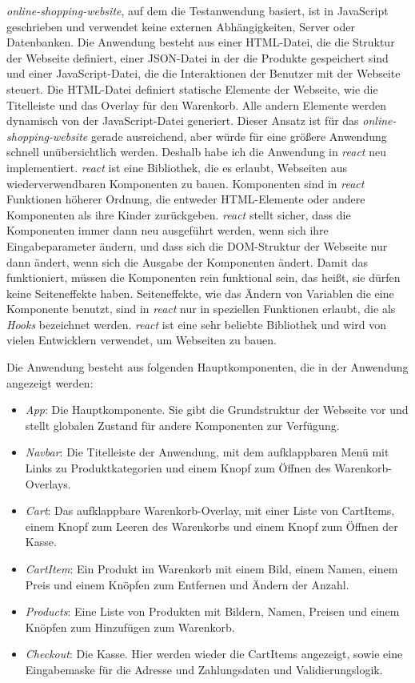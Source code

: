 \textit{online-shopping-website}, auf dem die Testanwendung basiert, ist in JavaScript geschrieben und verwendet keine externen Abhängigkeiten, Server oder Datenbanken.
Die Anwendung besteht aus einer HTML-Datei, die die Struktur der Webseite definiert, einer JSON-Datei in der die Produkte gespeichert sind und einer JavaScript-Datei, die die Interaktionen der Benutzer mit der Webseite steuert.
Die HTML-Datei definiert statische Elemente der Webseite, wie die Titelleiste und das Overlay für den Warenkorb.
Alle andern Elemente werden dynamisch von der JavaScript-Datei generiert.
Dieser Ansatz ist für das \textit{online-shopping-website} gerade ausreichend, aber würde für eine größere Anwendung schnell unübersichtlich werden.
Deshalb habe ich die Anwendung in \textit{react} neu implementiert.
\textit{react} ist eine Bibliothek, die es erlaubt, Webseiten aus wiederverwendbaren Komponenten zu bauen.
Komponenten sind in \textit{react} Funktionen höherer Ordnung, die entweder HTML-Elemente oder andere Komponenten als ihre Kinder zurückgeben.
\textit{react} stellt sicher, dass die Komponenten immer dann neu ausgeführt werden, wenn sich ihre Eingabeparameter ändern, und dass sich die DOM-Struktur der Webseite nur dann ändert, wenn sich die Ausgabe der Komponenten ändert.
Damit das funktioniert, müssen die Komponenten rein funktional sein, das heißt, sie dürfen keine Seiteneffekte haben.
Seiteneffekte, wie das Ändern von Variablen die eine Komponente benutzt, sind in \textit{react} nur in speziellen Funktionen erlaubt, die als \textit{Hooks} bezeichnet werden.
\textit{react} ist eine sehr beliebte Bibliothek und wird von vielen Entwicklern verwendet, um Webseiten zu bauen.

Die Anwendung besteht aus folgenden Hauptkomponenten, die in der Anwendung angezeigt werden:
\begin{itemize}
    \item \textit{App}: Die Hauptkomponente. Sie gibt die Grundstruktur der Webseite vor und stellt globalen Zustand für andere Komponenten zur Verfügung.
    \item \textit{Navbar}: Die Titelleiste der Anwendung, mit dem aufklappbaren Menü mit Links zu Produktkategorien und einem Knopf zum Öffnen des Warenkorb-Overlays.
    \item \textit{Cart}: Das aufklappbare Warenkorb-Overlay, mit einer Liste von CartItems, einem Knopf zum Leeren des Warenkorbs und einem Knopf zum Öffnen der Kasse.
    \item \textit{CartItem}: Ein Produkt im Warenkorb mit einem Bild, einem Namen, einem Preis und einem Knöpfen zum Entfernen und Ändern der Anzahl.
    \item \textit{Products}: Eine Liste von Produkten mit Bildern, Namen, Preisen und einem Knöpfen zum Hinzufügen zum Warenkorb.
    \item \textit{Checkout}: Die Kasse. Hier werden wieder die CartItems angezeigt, sowie eine Eingabemaske für die Adresse und Zahlungsdaten und Validierungslogik.
\end{itemize}

